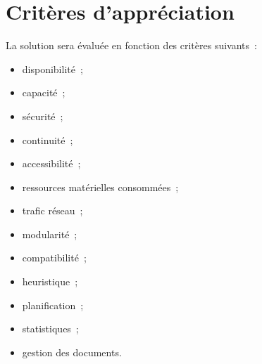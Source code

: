 \section{Critères d'appréciation}
La solution sera évaluée en fonction des critères suivants~:
\begin{itemize}
\item disponibilité~;
\item capacité~;
\item sécurité~;
\item continuité~;
\item accessibilité~;
\item ressources matérielles consommées~;
\item trafic réseau~;
\item modularité~;
\item compatibilité~;
\item heuristique~;
\item planification~;
\item statistiques~;
\item gestion des documents.
\end{itemize}

